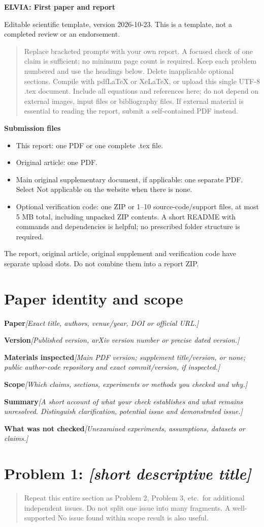 \documentclass[11pt]{article}
\newcommand{\prompt}[1]{\textit{\textcolor{promptink}{[#1]}}}
\newcommand{\entry}[2]{\textbf{#1}\quad\prompt{#2}\par}
\newcommand{\guidance}[1]{\begin{quote}\small #1\end{quote}}
\begin{document}
{\Large\bfseries\color{elvia} ELVIA: First paper and report}\par
{\small Editable scientific template, version 2026-10-23. This is a template,
not a completed review or an endorsement.}
\guidance{Replace bracketed prompts with your own report. A focused check of one
claim is sufficient; no minimum page count is required. Keep each problem numbered
and use the headings below. Delete inapplicable optional sections. Compile with
pdfLaTeX or XeLaTeX, or upload this single UTF-8 .tex document. Include all equations
and references here; do not depend on external images, input files or bibliography
files. If external material is essential to reading the report, submit a
self-contained PDF instead.}

\textbf{Submission files}
\begin{itemize}
\item This report: one PDF or one complete .tex file.
\item Original article: one PDF.
\item Main original supplementary document, if applicable: one separate PDF. Select Not applicable on the website when there is none.
\item Optional verification code: one ZIP or 1--10 source-code/support files,
at most 5 MB total, including unpacked ZIP contents. A short README with commands
and dependencies is helpful; no prescribed folder structure is required.
\end{itemize}
The report, original article, original supplement and verification code have
separate upload slots. Do not combine them into a report ZIP.

\section{Paper identity and scope}
\entry{Paper}{Exact title, authors, venue/year, DOI or official URL.}
\entry{Version}{Published version, arXiv version number or precise dated version.}
\entry{Materials inspected}{Main PDF version; supplement title/version, or none;
public author-code repository and exact commit/version, if inspected.}
\entry{Scope}{Which claims, sections, experiments or methods you checked and why.}
\entry{Summary}{A short account of what your check establishes and what remains
unresolved. Distinguish clarification, potential issue and demonstrated issue.}
\entry{What was not checked}{Unexamined experiments, assumptions, datasets or claims.}

\newpage
\section{Problem 1: \prompt{short descriptive title}}
\guidance{Repeat this entire section as Problem 2, Problem 3, etc.\ for additional
independent issues. Do not split one issue into many fragments. A well-supported
No issue found within scope result is also useful.}
\end{document}
